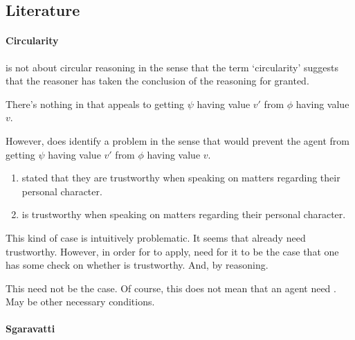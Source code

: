 \subsection{Literature}
\label{sec:zS:literature}

\paragraph{Circularity}

\begin{note}
  \ideaCS{} is not about circular reasoning in the sense that the term `circularity' suggests that the reasoner has taken the conclusion of the reasoning for granted.

  There's nothing in \ideaCS{} that appeals to getting \(\psi\) having value \(v'\) from \(\phi\) having value \(v\).

  However, does identify a problem in the sense that would prevent the agent from getting \(\psi\) having value \(v'\) from \(\phi\) having value \(v\).
\end{note}

\begin{note}[Testimony 1]
  \begin{illustration}[Testimony 1]
    \label{illu:CS:test:basic}
    \mbox{}
    \begin{enumerate}[label=\arabic*., ref=(\arabic*)]
    \item
      \label{ex:eiS:t:basic:test}
       stated that they are trustworthy when speaking on matters regarding their personal character.
    \item
      \label{ex:eiS:t:basic:ok}
       is trustworthy when speaking on matters regarding their personal character.
    \end{enumerate}
  \end{illustration}
  This kind of case is intuitively problematic.
  It seems that already need trustworthy.
  However, in order for \csN{} to apply, need for it to be the case that one has some check on whether  is trustworthy.
  And, by reasoning.

  This need not be the case.
  Of course, this does not mean that an agent need \csN{}.
  May be other necessary conditions.
\end{note}

\paragraph{Sgaravatti}

